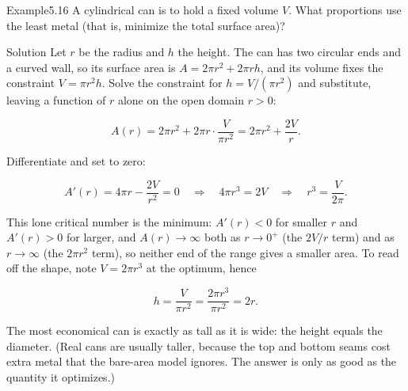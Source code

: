 \documentclass[a4paper,12pt,oneside]{memoir}
\begin{document}
\begin{workedexample}
\begin{envexample}{Example}{5.16}{}
A cylindrical can is to hold a fixed volume \(V\). What proportions use the least metal (that is, minimize the total surface area)?
\end{envexample}
\begin{envsolution}{Solution}{}{}
Let \(r\) be the radius and \(h\) the height. The can has two circular ends and a curved wall, so its surface area is \(A = 2\pi r^{2} + 2\pi r h\), and its volume fixes the constraint \(V = \pi r^{2} h\). Solve the constraint for \(h = V/(\pi r^{2})\) and substitute, leaving a function of \(r\) alone on the open domain \(r > 0\):

\[ A(r) = 2\pi r^{2} + 2\pi r \cdot \frac{V}{\pi r^{2}} = 2\pi r^{2} + \frac{2V}{r}. \]

Differentiate and set to zero:

\[ A'(r) = 4\pi r - \frac{2V}{r^{2}} = 0 \quad\Longrightarrow\quad 4\pi r^{3} = 2V \quad\Longrightarrow\quad r^{3} = \frac{V}{2\pi}. \]

This lone critical number is the minimum: \(A'(r) < 0\) for smaller \(r\) and \(A'(r) > 0\) for larger, and \(A(r) \to \infty\) both as \(r \to 0^{+}\) (the \(2V/r\) term) and as \(r \to \infty\) (the \(2\pi r^{2}\) term), so neither end of the range gives a smaller area. To read off the shape, note \(V = 2\pi r^{3}\) at the optimum, hence

\[ h = \frac{V}{\pi r^{2}} = \frac{2\pi r^{3}}{\pi r^{2}} = 2r. \]

The most economical can is exactly as tall as it is wide: the height equals the diameter. (Real cans are usually taller, because the top and bottom seams cost extra metal that the bare-area model ignores. The answer is only as good as the quantity it optimizes.) \qedmark
\end{envsolution}
\end{workedexample}
\end{document}
